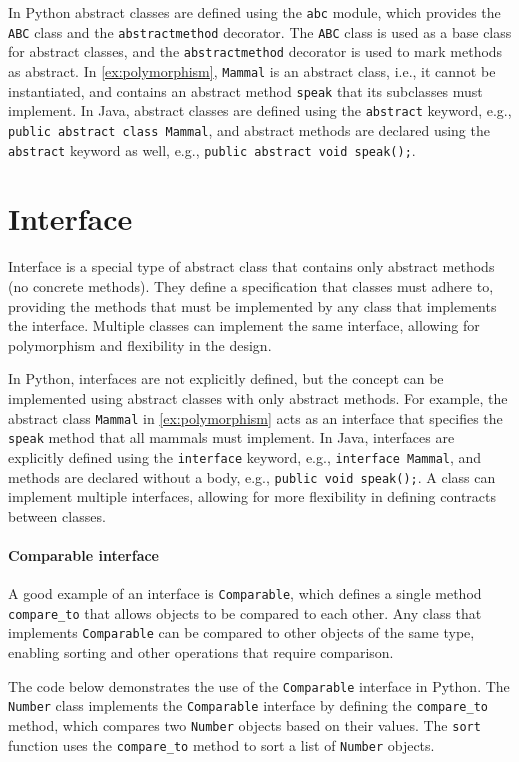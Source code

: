 \documentclass[oneside,11pt,dvipsnames]{book}
\newcommand{\code}[1]{\texttt{#1}}
\begin{document}
In Python abstract classes are defined using the \code{abc} module, which provides the \code{ABC} class and the \code{abstractmethod} decorator. The \code{ABC} class is used as a base class for abstract classes, and the \code{abstractmethod} decorator is used to mark methods as abstract. In \autoref{ex:polymorphism},
\code{Mammal} is an abstract class, i.e., it cannot be instantiated, and contains an abstract method \code{speak} that its subclasses must implement.
In Java, abstract classes are defined using the \code{abstract} keyword, e.g., \code{public abstract class Mammal}, and abstract methods are declared using the \code{abstract} keyword as well, e.g., \code{public abstract void speak();}.

\section{Interface}

Interface is a special type of abstract class that contains only abstract methods (no concrete methods). They define a specification that classes must adhere to, providing the methods that must be implemented by any class that implements the interface. Multiple classes can implement the same interface, allowing for polymorphism and flexibility in the design.

In Python, interfaces are not explicitly defined, but the concept can be implemented using abstract classes with only abstract methods. For example, the abstract class \code{Mammal} in \autoref{ex:polymorphism} acts as an interface that specifies the \code{speak} method that all mammals must implement.
In Java, interfaces are explicitly defined using the \code{interface} keyword, e.g., \code{interface Mammal}, and methods are declared without a body, e.g., \code{public void speak();}. A class can implement multiple interfaces, allowing for more flexibility in defining contracts between classes.


\paragraph{Comparable interface} A good example of an interface is \code{Comparable}, which defines a single method \code{compare\_to} that allows objects to be compared to each other. Any class that implements \code{Comparable} can be compared to other objects of the same type, enabling sorting and other operations that require comparison.

The code below demonstrates the use of the \code{Comparable} interface in Python. The \code{Number} class implements the \code{Comparable} interface by defining the \code{compare\_to} method, which compares two \code{Number} objects based on their values. The \code{sort} function uses the \code{compare\_to} method to sort a list of \code{Number} objects.
\end{document}

